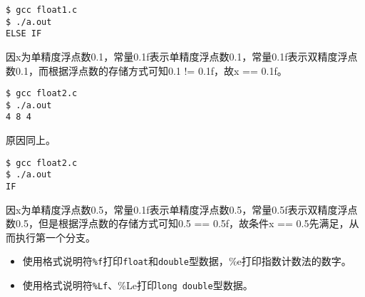 \begin{frame}[fragile]

\end{frame}

\begin{frame}[fragile]
\begin{lstlisting}
$ gcc float1.c
$ ./a.out 
ELSE IF
\end{lstlisting}\pause 


因x为单精度浮点数0.1，常量0.1f表示单精度浮点数0.1，常量0.1f表示双精度浮点数0.1，而根据浮点数的存储方式可知0.1 != 0.1f，故x == 0.1f。
 
\end{frame}



\begin{frame}[fragile]

\end{frame}

\begin{frame}[fragile]
\begin{lstlisting}
$ gcc float2.c
$ ./a.out 
4 8 4
\end{lstlisting}\pause 


原因同上。
\end{frame}


\begin{frame}[fragile]

\end{frame}

\begin{frame}[fragile]
\begin{lstlisting}
$ gcc float2.c
$ ./a.out 
IF
\end{lstlisting}\pause 


因x为单精度浮点数0.5，常量0.1f表示单精度浮点数0.5，常量0.5f表示双精度浮点数0.5，但是根据浮点数的存储方式可知0.5 == 0.5f，故条件x == 0.5先满足，从而执行第一个分支。

\end{frame}

\begin{frame}[fragile]
\begin{itemize}
\item 使用格式说明符\lstinline|%f|打印\lstinline|float|和\lstinline|double|型数据，{\tf \%e}打印指数计数法的数字。\\[0.1in]
\item 使用格式说明符\lstinline|%Lf|、{\tf \%Le}打印\lstinline|long double|型数据。
\end{itemize}
\end{frame}

